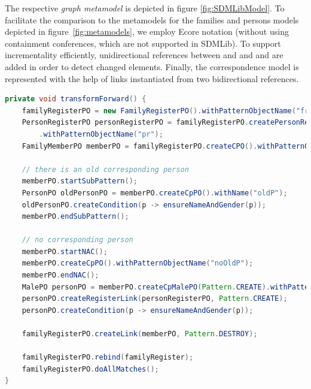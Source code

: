 The respective \emph{graph metamodel} is depicted in figure \ref{fig:SDMLibModel}. To facilitate the comparison to the metamodels for the families and persons models depicted in figure~\ref{fig:metamodels}, we employ Ecore notation (without using containment conferences, which are not supported in SDMLib). To support incrementality efficiently, unidirectional references between  and  and  and  are added in order to detect changed elements. Finally, the correspondence model is represented with the help of links instantiated from two bidirectional references.





\begin{lstlisting}[label={lst:sdmlib}, float=*t, language=java, caption={Forward transformation in SDMLib}]
private void transformForward() {
    familyRegisterPO = new FamilyRegisterPO().withPatternObjectName("fr");
    PersonRegisterPO personRegisterPO = familyRegisterPO.createPersonRegisterPO()
        .withPatternObjectName("pr");
    FamilyMemberPO memberPO = familyRegisterPO.createCPO().withPatternObjectName("fm");

    // there is an old corresponding person
    memberPO.startSubPattern();
    PersonPO oldPersonPO = memberPO.createCpPO().withName("oldP");
    oldPersonPO.createCondition(p -> ensureNameAndGender(p));
    memberPO.endSubPattern();

    // no corresponding person
    memberPO.startNAC();
    memberPO.createCpPO().withPatternObjectName("noOldP");
    memberPO.endNAC();
    MalePO personPO = memberPO.createCpMalePO(Pattern.CREATE).withPatternObjectName("newP");
    personPO.createRegisterLink(personRegisterPO, Pattern.CREATE);
    personPO.createCondition(p -> ensureNameAndGender(p));
    
    familyRegisterPO.createLink(memberPO, Pattern.DESTROY);

    familyRegisterPO.rebind(familyRegister);
    familyRegisterPO.doAllMatches();	    
}
\end{lstlisting}

